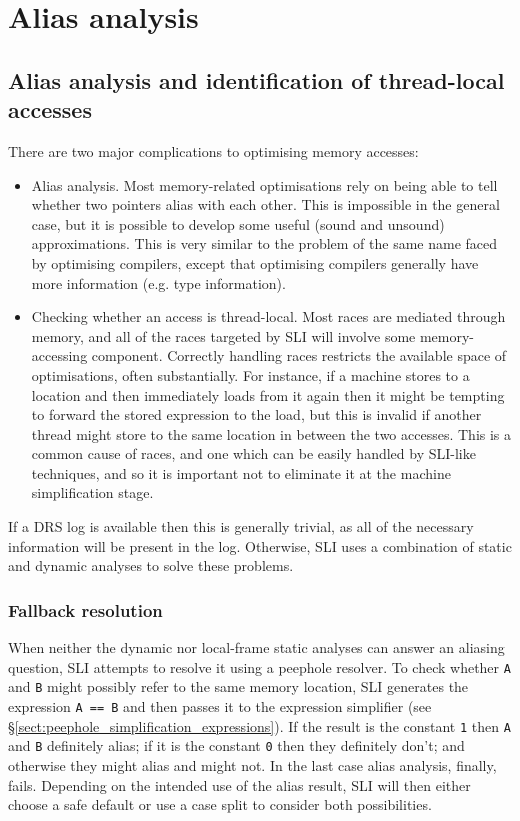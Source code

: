 \section{Alias analysis}
\subsection{Alias analysis and identification of thread-local accesses}
There are two major complications to optimising memory accesses:

\begin{itemize}
\item
  Alias analysis.
  Most memory-related optimisations rely on being able to tell whether two pointers alias with each other.
  This is impossible in the general case, but it is possible to develop some useful (sound and unsound) approximations.
  This is very similar to the problem of the same name faced by optimising compilers, except that optimising compilers generally have more information (e.g. type information).
\item
  Checking whether an access is thread-local.
  Most races are mediated through memory, and all of the races targeted by SLI will involve some memory-accessing component.
  Correctly handling races restricts the available space of optimisations, often substantially.
  For instance, if a machine stores to a location and then immediately loads from it again then it might be tempting to forward the stored expression to the load, but this is invalid if another thread might store to the same location in between the two accesses.
  This is a common cause of races, and one which can be easily handled by SLI-like techniques, and so it is important not to eliminate it at the machine simplification stage.
\end{itemize}

If a DRS log is available then this is generally trivial, as all of the necessary information will be present in the log.
Otherwise, SLI uses a combination of static and dynamic analyses to solve these problems.

\subsubsection{Fallback resolution}
When neither the dynamic nor local-frame static analyses can answer an aliasing question, SLI attempts to resolve it using a peephole resolver.
To check whether \verb|A| and \verb|B| might possibly refer to the same memory location, SLI generates the expression \verb|A == B| and then passes it to the expression simplifier (see \S\ref{sect:peephole_simplification_expressions}).
If the result is the constant \verb|1| then \verb|A| and \verb|B| definitely alias; if it is the constant \verb|0| then they definitely don't; and otherwise they might alias and might not.
In the last case alias analysis, finally, fails.
Depending on the intended use of the alias result, SLI will then either choose a safe default or use a case split to consider both possibilities.

